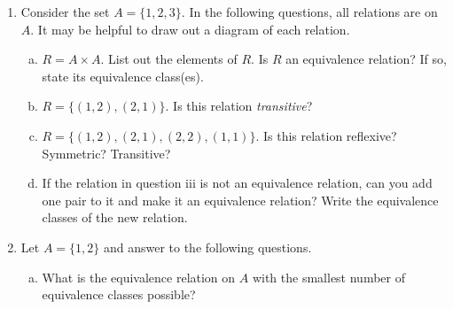 \documentclass[12pt,letterpaper]{article}
\newif\ifsol
\newcommand{\solu}[2]{ \begin{mdframed} \ifsol #2 \else \vspace{#1} \fi \end{mdframed} }
\begin{document}
	\begin{enumerate}[1.]
        
		\item Consider the set $A = \{1,2,3\}$. In the following questions, all relations are on $A$. It may be helpful to draw out a diagram of each relation.
		
			\begin{enumerate}[a.]
				\item $R = A \times A$. List out the elements of $R$. Is $R$ an equivalence relation? If so, state its equivalence class(es).

				\solu{2cm}{$\{(1,1), (1,2),(1,3),(2,1),(2,2),(2,3),(3,1),(3,2),(3,3)\}$. It is an equivalence relation because everything is related to each other, since it's the entire Cartesian product. There is only one equivalence class: the entire set.}
				
				
				\item  $R = \{(1, 2), (2, 1)\}$. Is this relation \textit{transitive}?
				
				\solu{1cm}{No, it's not transitive. $(1, 2), (2, 1) \in R \implies (1, 1) \in R$, but it's not actually in $R$. The same argument works for $(2, 2)$.}
				
				\item  $R = \{(1, 2), (2, 1),(2,2),(1,1)\}$. Is this relation reflexive? Symmetric? Transitive?
				
				\solu{3cm}{$(3, 3)$ is not in $R$, so it's not reflexive (since we defined $R$ to be on $A$. However, it is transitive and symmetric.}
				
				\item If the relation in question iii is not an equivalence relation, can you add one pair to it and make it an equivalence relation? Write the equivalence classes of the new relation. 
				
				\solu{2cm}{Yes, add $(3, 3)$. In that case, the equivalence classes become $\{1, 2\}$ and $\{3\}$.}
				
				\end{enumerate}
	\item Let $A=\{1,2\}$ and answer to the following questions.
				\begin{enumerate}[a.]
				
				\item What is the equivalence relation on $A$ with the smallest number of equivalence classes possible?
				
				\solu{1cm}{$A \times A$, a world where everything is equal to everything.}
				

\end{enumerate}
\end{enumerate}
\end{document}
